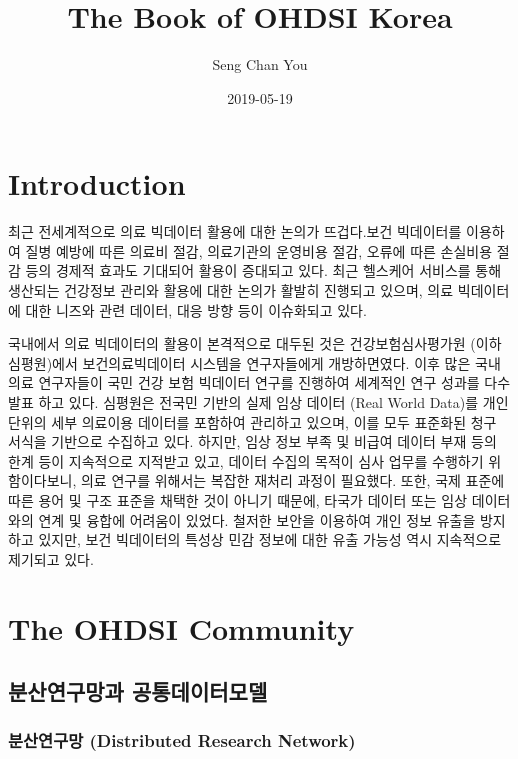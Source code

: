 \documentclass[]{book}
\title{The Book of OHDSI Korea}
\author{Seng Chan You}
\date{2019-05-19}
\begin{document}
\maketitle

{
\setcounter{tocdepth}{1}
\tableofcontents
}
\chapter{Introduction}\label{introduction}

최근 전세계적으로 의료 빅데이터 활용에 대한 논의가 뜨겁다.보건
빅데이터를 이용하여 질병 예방에 따른 의료비 절감, 의료기관의 운영비용
절감, 오류에 따른 손실비용 절감 등의 경제적 효과도 기대되어 활용이
증대되고 있다. 최근 헬스케어 서비스를 통해 생산되는 건강정보 관리와
활용에 대한 논의가 활발히 진행되고 있으며, 의료 빅데이터에 대한 니즈와
관련 데이터, 대응 방향 등이 이슈화되고 있다.

국내에서 의료 빅데이터의 활용이 본격적으로 대두된 것은
건강보험심사평가원 (이하 심평원)에서 보건의료빅데이터 시스템을
연구자들에게 개방하면였다. 이후 많은 국내 의료 연구자들이 국민 건강 보험
빅데이터 연구를 진행하여 세계적인 연구 성과를 다수 발표 하고 있다.
심평원은 전국민 기반의 실제 임상 데이터 (Real World Data)를 개인 단위의
세부 의료이용 데이터를 포함하여 관리하고 있으며, 이를 모두 표준화된 청구
서식을 기반으로 수집하고 있다. 하지만, 임상 정보 부족 및 비급여 데이터
부재 등의 한계 등이 지속적으로 지적받고 있고, 데이터 수집의 목적이 심사
업무를 수행하기 위함이다보니, 의료 연구를 위해서는 복잡한 재처리 과정이
필요했다. 또한, 국제 표준에 따른 용어 및 구조 표준을 채택한 것이 아니기
때문에, 타국가 데이터 또는 임상 데이터와의 연계 및 융합에 어려움이
있었다. 철저한 보안을 이용하여 개인 정보 유출을 방지하고 있지만, 보건
빅데이터의 특성상 민감 정보에 대한 유출 가능성 역시 지속적으로 제기되고
있다.

\chapter{The OHDSI Community}\label{ohdsiCommunity}

\section{분산연구망과 공통데이터모델}\label{drnCdm}

\subsection{분산연구망 (Distributed Research
Network)}\label{-distributed-research-network}
\end{document}
